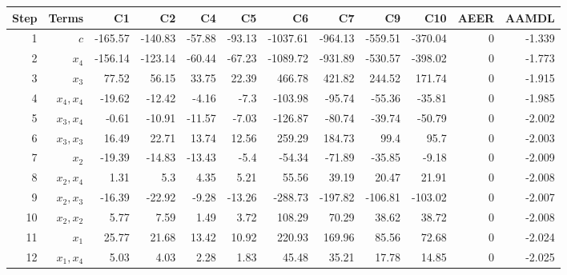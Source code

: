 \begin{tabular}{rrrrrrrrrrrr}
Step & Terms & C1 & C2 & C4 & C5 & C6 & C7 & C9 & C10 & AEER & AAMDL \\ 
\hline 
1 & $c$ & -165.57 & -140.83 & -57.88 & -93.13 & -1037.61 & -964.13 & -559.51 & -370.04 & 0 & -1.339 \\ 
2 & $x_4$ & -156.14 & -123.14 & -60.44 & -67.23 & -1089.72 & -931.89 & -530.57 & -398.02 & 0 & -1.773 \\ 
3 & $x_3$ & 77.52 & 56.15 & 33.75 & 22.39 & 466.78 & 421.82 & 244.52 & 171.74 & 0 & -1.915 \\ 
4 & $x_4,x_4$ & -19.62 & -12.42 & -4.16 & -7.3 & -103.98 & -95.74 & -55.36 & -35.81 & 0 & -1.985 \\ 
5 & $x_3,x_4$ & -0.61 & -10.91 & -11.57 & -7.03 & -126.87 & -80.74 & -39.74 & -50.79 & 0 & -2.002 \\ 
6 & $x_3,x_3$ & 16.49 & 22.71 & 13.74 & 12.56 & 259.29 & 184.73 & 99.4 & 95.7 & 0 & -2.003 \\ 
7 & $x_2$ & -19.39 & -14.83 & -13.43 & -5.4 & -54.34 & -71.89 & -35.85 & -9.18 & 0 & -2.009 \\ 
8 & $x_2,x_4$ & 1.31 & 5.3 & 4.35 & 5.21 & 55.56 & 39.19 & 20.47 & 21.91 & 0 & -2.008 \\ 
9 & $x_2,x_3$ & -16.39 & -22.92 & -9.28 & -13.26 & -288.73 & -197.82 & -106.81 & -103.02 & 0 & -2.007 \\ 
10 & $x_2,x_2$ & 5.77 & 7.59 & 1.49 & 3.72 & 108.29 & 70.29 & 38.62 & 38.72 & 0 & -2.008 \\ 
11 & $x_1$ & 25.77 & 21.68 & 13.42 & 10.92 & 220.93 & 169.96 & 85.56 & 72.68 & 0 & -2.024 \\ 
12 & $x_1,x_4$ & 5.03 & 4.03 & 2.28 & 1.83 & 45.48 & 35.21 & 17.78 & 14.85 & 0 & -2.025 \\ 
\hline 
\end{tabular}